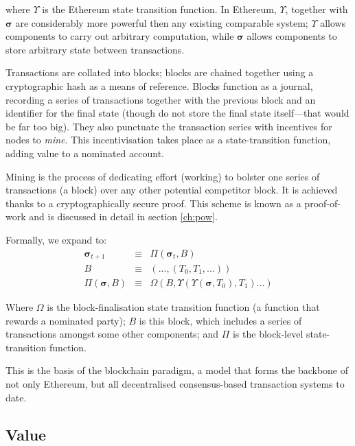 \documentclass[9pt,oneside]{amsart}
\begin{document}
\begin{multicols}{2}
where $\Upsilon$ is the Ethereum state transition function. In Ethereum, $\Upsilon$, together with $\boldsymbol{\sigma}$ are considerably more powerful then any existing comparable system; $\Upsilon$ allows components to carry out arbitrary computation, while $\boldsymbol{\sigma}$ allows components to store arbitrary state between transactions.

Transactions are collated into blocks; blocks are chained together using a cryptographic hash as a means of reference. Blocks function as a journal, recording a series of transactions together with the previous block and an identifier for the final state (though do not store the final state itself---that would be far too big). They also punctuate the transaction series with incentives for nodes to \textit{mine}. This incentivisation takes place as a state-transition function, adding value to a nominated account.

Mining is the process of dedicating effort (working) to bolster one series of transactions (a block) over any other potential competitor block. It is achieved thanks to a cryptographically secure proof. This scheme is known as a proof-of-work and is discussed in detail in section \ref{ch:pow}.

Formally, we expand to:
\begin{eqnarray}
\boldsymbol{\sigma}_{t+1} & \equiv & \Pi(\boldsymbol{\sigma}_t, B) \\
B & \equiv & (..., (T_0, T_1, ...) ) \\
\Pi(\boldsymbol{\sigma}, B) & \equiv & \Omega(B, \Upsilon(\Upsilon(\boldsymbol{\sigma}, T_0), T_1) ...)
\end{eqnarray}

Where $\Omega$ is the block-finalisation state transition function (a function that rewards a nominated party); $B$ is this block, which includes a series of transactions amongst some other components; and $\Pi$ is the block-level state-transition function.

This is the basis of the blockchain paradigm, a model that forms the backbone of not only Ethereum, but all decentralised consensus-based transaction systems to date.

\subsection{Value}


\end{multicols}
\end{document}
